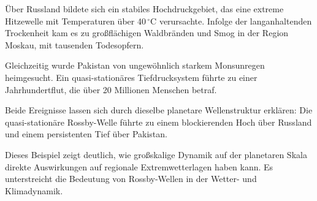 \begin{refsection}
Über Russland bildete sich ein stabiles Hochdruckgebiet, das eine extreme Hitzewelle mit Temperaturen über 40\,$^\circ$C verursachte.  
Infolge der langanhaltenden Trockenheit kam es zu großflächigen Waldbränden und Smog in der Region Moskau, mit tausenden Todesopfern.  

Gleichzeitig wurde Pakistan von ungewöhnlich starkem Monsunregen heimgesucht.  
Ein quasi-stationäres Tiefdrucksystem führte zu einer Jahrhundertflut, die über 20 Millionen Menschen betraf.  

Beide Ereignisse lassen sich durch dieselbe planetare Wellenstruktur erklären:  
Die quasi-stationäre Rossby-Welle führte zu einem blockierenden Hoch über Russland und einem persistenten Tief über Pakistan.  

Dieses Beispiel zeigt deutlich, wie großskalige Dynamik auf der planetaren Skala direkte Auswirkungen auf regionale Extremwetterlagen haben kann.  
Es unterstreicht die Bedeutung von Rossby-Wellen in der Wetter- und Klimadynamik.\cite{rossby:petoukhov2013}


	\printbibliography[heading=subbibliography]
\end{refsection}
